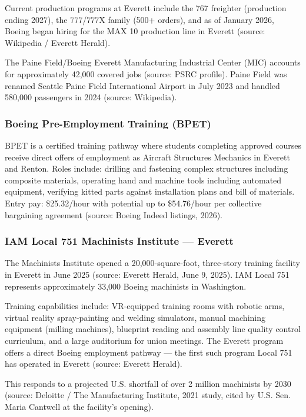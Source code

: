 \documentclass[11pt,letterpaper]{article}
\begin{document}
Current production programs at Everett include the 767 freighter (production ending 2027), the 777/777X family (500+ orders), and as of January 2026, Boeing began hiring for the MAX 10 production line in Everett (source: Wikipedia / Everett Herald).

The Paine Field/Boeing Everett Manufacturing Industrial Center (MIC) accounts for approximately 42,000 covered jobs (source: PSRC profile). Paine Field was renamed Seattle Paine Field International Airport in July 2023 and handled 580,000 passengers in 2024 (source: Wikipedia).

\subsubsection{Boeing Pre-Employment Training (BPET)}

BPET is a certified training pathway where students completing approved courses receive direct offers of employment as Aircraft Structures Mechanics in Everett and Renton. Roles include: drilling and fastening complex structures including composite materials, operating hand and machine tools including automated equipment, verifying kitted parts against installation plans and bill of materials. Entry pay: \$25.32/hour with potential up to \$54.76/hour per collective bargaining agreement (source: Boeing Indeed listings, 2026).

\subsubsection{IAM Local 751 Machinists Institute --- Everett}

The Machinists Institute opened a 20,000-square-foot, three-story training facility in Everett in June 2025 (source: Everett Herald, June 9, 2025). IAM Local 751 represents approximately 33,000 Boeing machinists in Washington.

Training capabilities include: VR-equipped training rooms with robotic arms, virtual reality spray-painting and welding simulators, manual machining equipment (milling machines), blueprint reading and assembly line quality control curriculum, and a large auditorium for union meetings. The Everett program offers a direct Boeing employment pathway --- the first such program Local 751 has operated in Everett (source: Everett Herald).

This responds to a projected U.S. shortfall of over 2 million machinists by 2030 (source: Deloitte / The Manufacturing Institute, 2021 study, cited by U.S. Sen. Maria Cantwell at the facility's opening).
\end{document}
